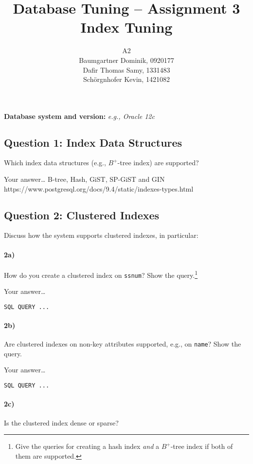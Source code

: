\documentclass[11pt]{scrartcl}
\title{
  \textbf{\large Database Tuning -- Assignment 3}\\
  Index Tuning
}
\author{
 A2\\
\large Baumgartner Dominik, 0920177 \\
\large Dafir Thomas Samy, 1331483 \\
\large Sch\"orgnhofer Kevin, 1421082
}
\begin{document}
\maketitle

\medskip

\noindent\textbf{Database system and version:} {\it e.g., Oracle 12c}

\subsection*{Question 1: Index Data Structures} Which index data structures (e.g., $B^+$-tree
index) are supported?

\smallskip

Your answer\dots
B-tree, Hash, GiST, SP-GiST and GIN\\
https://www.postgresql.org/docs/9.4/static/indexes-types.html

\subsection*{Question 2: Clustered Indexes} Discuss how the system
supports clustered indexes, in particular:

\paragraph{2a)} How do you create a clustered index on {\tt ssnum}?
Show the query.\footnote{Give the queries for creating a hash index
  \emph{and} a $B^+$-tree index if both of them are supported.}

\smallskip

Your answer\dots

{\small
\begin{verbatim}
SQL QUERY ...
\end{verbatim}
}

\paragraph{2b)} Are clustered indexes on non-key attributes supported, e.g.,
on {\tt name}?  Show the query.

\smallskip

Your answer\dots

{\small
\begin{verbatim}
SQL QUERY ...
\end{verbatim}
}

\paragraph{2c)} Is the clustered index dense or sparse?
\end{document}
